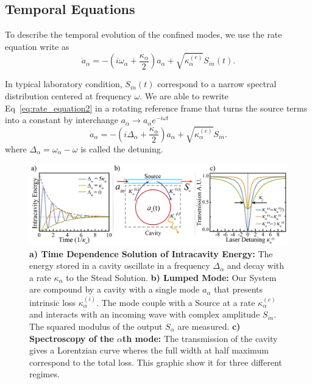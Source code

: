\subsection{Temporal Equations}

To describe the temporal evolution of the confined modes, we use the rate equation write as 
\begin{equation}
    \dot{a}_\alpha = -\left(i\omega_\alpha +\frac{\kappa_\alpha}{2}\right)a_\alpha +\sqrt{\kappa^{(e)}_\alpha}S_{in}(t).
    \label{eq:rate_equation2}
\end{equation} 

In typical laboratory condition, $S_{in}(t)$ correspond to a narrow spectral distribution centered at frequency $\omega$. We are able to rewrite Eq~\ref{eq:rate_equation2} in a rotating reference frame that turns the source terms into a constant by interchange $a_\alpha \rightarrow a_\alpha e^{-i\omega t}$
\begin{equation}
    \dot{a}_\alpha = -\left(i\Delta_\alpha +\frac{\kappa_\alpha}{2}\right)a_\alpha +\sqrt{\kappa^{(e)}_\alpha}S_{in}.
    \label{eq:rate_equation_unperturbed}
\end{equation}
where $\Delta_\alpha = \omega_\alpha - \omega$ is called the detuning.
\begin{figure}[t!]
    \centering
    \includegraphics[width = 16cm]{Dissertation_rate_equation.jpg}
    \caption{\textbf{a) Time Dependence Solution of Intracavity Energy:} The energy stored in a cavity oscillate in a frequency $\Delta_\alpha$ and decay with a rate $\kappa_\alpha$ to the Stead Solution. \textbf{b) Lumped Mode:} Our System are compound by a cavity with a single mode $a_\alpha$ that presents intrinsic loss $\kappa_\alpha^{(i)}$. The mode couple with a Source at a rate $\kappa_\alpha^{(e)}$ and interacts with an incoming wave with complex amplitude $S_{in}$. The squared modulus of the output $S_\alpha$ are measured. \textbf{c) Spectroscopy of the $\alpha$th mode:} The transmission of the cavity gives a Lorentzian curve wheres the full width at half maximum correspond to the total loss. This graphic show it for three different regimes.}
    \label{fig:rate_equations_single_mode}
\end{figure}

